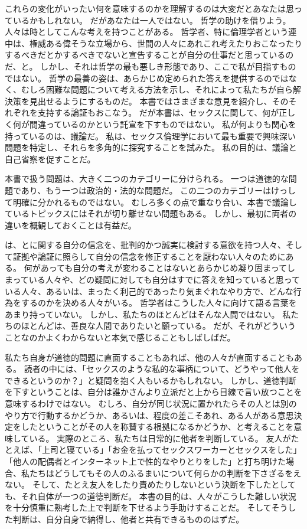 \documentclass[paper=a4,book,openany]{jlreq}
\begin{document}
これらの変化がいったい何を意味するのかを理解するのは大変だとあなたは思っているかもしれない。
だがあなたは一人ではない。
哲学の助けを借りよう。
人々は時としてこんな考えを持つことがある。
哲学者、特に倫理学者という連中は、権威ある偉そうな立場から、世間の人々にあれこれ考えたりおこなったりするべきだとかするべきでないと宣告することが自分の仕事だと思っているのだ、と。
しかし、それは哲学の最も悪しき形態であり、ここで私が目指すものではない。
哲学の最善の姿は、あらかじめ定められた答えを提供するのではなく、むしろ困難な問題について考える方法を示し、それによって私たちが自ら解決策を見出せるようにするものだ。
本書ではさまざまな意見を紹介し、そのそれぞれを支持する論証もおこなう。
だが本書は、セックスに関して、何が正しく何が間違っているのかという託宣を下すものではない。
私が何よりも関心を持っているのは、議論だ。
私は、セックス倫理学において最も重要で興味深い問題を特定し、それらを多角的に探究することを試みた。
私の目的は、議論と自己省察を促すことだ。

本書で扱う問題は、大きく二つのカテゴリーに分けられる。
一つは道徳的な問題であり、もう一つは政治的・法的な問題だ。
この二つのカテゴリーはけっして明確に分かれるものではない。
むしろ多くの点で重なり合い、本書で議論しているトピックスにはそれが切り離せない問題もある。
しかし、最初に両者の違いを概観しておくことは有益だ。

は、とに関する自分の信念を、批判的かつ誠実に検討する意欲を持つ人々、そして証拠や論証に照らして自分の信念を修正することを厭わない人々のためにある。
何があっても自分の考えが変わることはないとあらかじめ凝り固まってしまっている人々や、どの疑問に対しても自分はすでに答えを知っていると思っている人々、あるいは、まったく利己的であったり気まぐれなやり方で、どんな行為をするのかを決める人々がいる。
哲学者はこうした人々に向けて語る言葉をあまり持っていない。
しかし、私たちのほとんどはそんな人間ではない。
私たちのほとんどは、善良な人間でありたいと願っている。
だが、それがどういうことなのかよくわからないと本気で感じることもしばしばだ。

私たち自身が道徳的問題に直面することもあれば、他の人々が直面することもある。
読者の中には、「セックスのような私的な事柄について、どうやって他人をできるというのか？」と疑問を抱く人もいるかもしれない。
しかし、道徳判断を下すということは、自分は誰かさんより立派だと上から目線で言い放つことを意味するわけではない。
むしろ、自分が同じ状況に置かれたらその人とは別のやり方で行動するかどうか、あるいは、程度の差こそあれ、ある人がある意思決定をしたということがその人を称賛する根拠になるかどうか、と考えることを意味している。
実際のところ、私たちは日常的に他者を判断している。
友人がたとえば、「上司と寝ている」「お金を払ってセックスワーカーとセックスをした」「他人の配偶者とインターネット上で性的なやりとりをした」と打ち明けた場合、私たちはどうしてもその人のふるまいについて何らかの判断を下さざるをえない。
そして、たとえ友人をしたり責めたりしないという決断を下したとしても、それ自体が一つの道徳判断だ。
本書の目的は、人々がこうした難しい状況を十分慎重に熟考した上で判断を下せるよう手助けすることだ。
そしてそうした判断は、自分自身で納得し、他者と共有できるもののはずだ。
\end{document}
